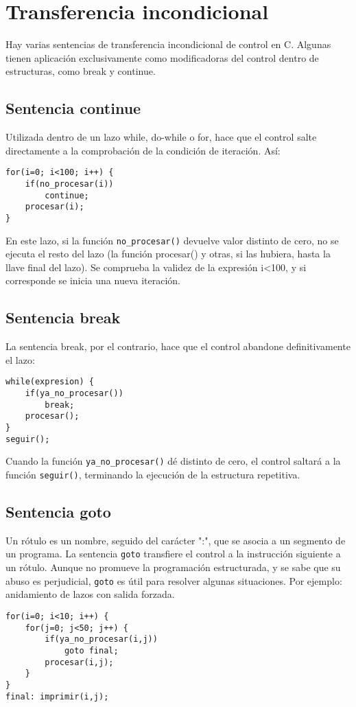\section{Transferencia incondicional}
Hay varias sentencias de transferencia incondicional de control en C. Algunas
tienen aplicación exclusivamente como modificadoras del control dentro de
estructuras, como break y continue.

\subsection{Sentencia continue}
Utilizada dentro de un lazo while, do-while o for, hace que el control salte
directamente a la comprobación de la condición de iteración. Así:
\begin{lstlisting}
for(i=0; i<100; i++) {
    if(no_procesar(i))
        continue;
    procesar(i);
}
\end{lstlisting}

En este lazo, si la función \lstinline{no_procesar()} devuelve valor distinto de cero, no
se ejecuta el resto del lazo (la función procesar() y otras, si las hubiera,
hasta la llave final del lazo). Se comprueba la validez de la expresión i<100,
y si corresponde se inicia una nueva iteración.

\subsection{Sentencia break}
La sentencia break, por el contrario, hace que el control abandone
definitivamente el lazo:
\begin{lstlisting}
while(expresion) {
    if(ya_no_procesar())
        break;
    procesar();
}
seguir();
\end{lstlisting}

Cuando la función \lstinline{ya_no_procesar()} dé distinto de cero, el control saltará a la
función \lstinline{seguir()}, terminando la ejecución de la estructura repetitiva.

\subsection{Sentencia goto}
Un rótulo es un nombre, seguido del carácter ":", que se asocia a un segmento
de un programa. La sentencia \texttt{goto} transfiere el control a la instrucción
siguiente a un rótulo. Aunque no promueve la programación estructurada, y se
sabe que su abuso es perjudicial, \texttt{goto} es útil para resolver algunas
situaciones. Por ejemplo: anidamiento de lazos con salida forzada.
\begin{lstlisting}
for(i=0; i<10; i++) {
    for(j=0; j<50; j++) {
        if(ya_no_procesar(i,j))
            goto final;
        procesar(i,j);
    }
}
final: imprimir(i,j);
\end{lstlisting}


